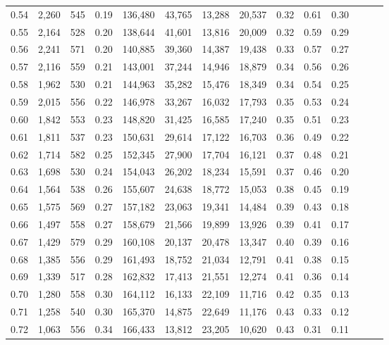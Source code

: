 \begin{tabular}{rrrrrrrrrrrrrr}
0.54 &  2,260 &  545 &  0.19 &  136,480 &   43,765 &  13,288 &  20,537 &  0.32 &  0.61 &      0.30 \\
0.55 &  2,164 &  528 &  0.20 &  138,644 &   41,601 &  13,816 &  20,009 &  0.32 &  0.59 &      0.29 \\
0.56 &  2,241 &  571 &  0.20 &  140,885 &   39,360 &  14,387 &  19,438 &  0.33 &  0.57 &      0.27 \\
0.57 &  2,116 &  559 &  0.21 &  143,001 &   37,244 &  14,946 &  18,879 &  0.34 &  0.56 &      0.26 \\
0.58 &  1,962 &  530 &  0.21 &  144,963 &   35,282 &  15,476 &  18,349 &  0.34 &  0.54 &      0.25 \\
0.59 &  2,015 &  556 &  0.22 &  146,978 &   33,267 &  16,032 &  17,793 &  0.35 &  0.53 &      0.24 \\
0.60 &  1,842 &  553 &  0.23 &  148,820 &   31,425 &  16,585 &  17,240 &  0.35 &  0.51 &      0.23 \\
0.61 &  1,811 &  537 &  0.23 &  150,631 &   29,614 &  17,122 &  16,703 &  0.36 &  0.49 &      0.22 \\
0.62 &  1,714 &  582 &  0.25 &  152,345 &   27,900 &  17,704 &  16,121 &  0.37 &  0.48 &      0.21 \\
0.63 &  1,698 &  530 &  0.24 &  154,043 &   26,202 &  18,234 &  15,591 &  0.37 &  0.46 &      0.20 \\
0.64 &  1,564 &  538 &  0.26 &  155,607 &   24,638 &  18,772 &  15,053 &  0.38 &  0.45 &      0.19 \\
0.65 &  1,575 &  569 &  0.27 &  157,182 &   23,063 &  19,341 &  14,484 &  0.39 &  0.43 &      0.18 \\
0.66 &  1,497 &  558 &  0.27 &  158,679 &   21,566 &  19,899 &  13,926 &  0.39 &  0.41 &      0.17 \\
0.67 &  1,429 &  579 &  0.29 &  160,108 &   20,137 &  20,478 &  13,347 &  0.40 &  0.39 &      0.16 \\
0.68 &  1,385 &  556 &  0.29 &  161,493 &   18,752 &  21,034 &  12,791 &  0.41 &  0.38 &      0.15 \\
0.69 &  1,339 &  517 &  0.28 &  162,832 &   17,413 &  21,551 &  12,274 &  0.41 &  0.36 &      0.14 \\
0.70 &  1,280 &  558 &  0.30 &  164,112 &   16,133 &  22,109 &  11,716 &  0.42 &  0.35 &      0.13 \\
0.71 &  1,258 &  540 &  0.30 &  165,370 &   14,875 &  22,649 &  11,176 &  0.43 &  0.33 &      0.12 \\
0.72 &  1,063 &  556 &  0.34 &  166,433 &   13,812 &  23,205 &  10,620 &  0.43 &  0.31 &      0.11 \\

\end{tabular}
